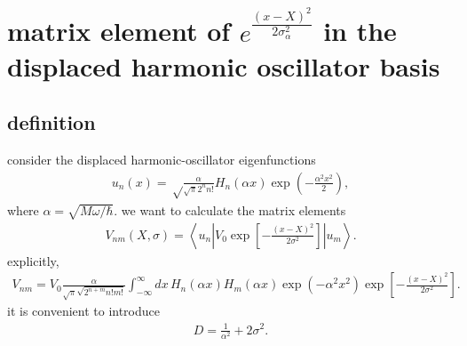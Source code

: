 \section{matrix element of $e^\frac{(x-X)^2}{2\sigma_\alpha^2}$ in the displaced harmonic oscillator basis}
\label{sec:matrix-element-of-efracx-x2-2sigma_alpha2-in-the-displaced-harmonic-oscillator-basis}
\subsection{definition}
consider the displaced  harmonic-oscillator eigenfunctions
\begin{align}
    u_n(x)
    =
    \sqrt\frac{\alpha}{\sqrt{\pi}2^n n!}
    H_n(\alpha x)
    \exp\left(-\frac{\alpha^2x^2}{2}\right),
\end{align}
where $\alpha = \sqrt{M\omega/\hbar}$.
we want to calculate the matrix elements
\begin{align}
    V_{nm}(X,\sigma)
    =
    \left\langle u_n\left|V_0
    \exp\left[-\frac{(x-X)^2}{2\sigma^2}\right]
    \right|u_m\right\rangle .
\end{align}
explicitly,
\begin{align}
    V_{nm}
    =
    V_0 \frac{\alpha}{\sqrt{\pi}\sqrt{2^{n+m}n!m!}}
    \int_{-\infty}^{\infty} dx\,
    H_n(\alpha x)H_m(\alpha x)
    \exp\left(-\alpha^2 x^2\right)
    \exp\left[-\frac{(x-X)^2}{2\sigma^2}\right].
\end{align}
it is convenient to introduce
\begin{align}
    D=\frac{1}{\alpha^2}+2\sigma^2.
\end{align}


